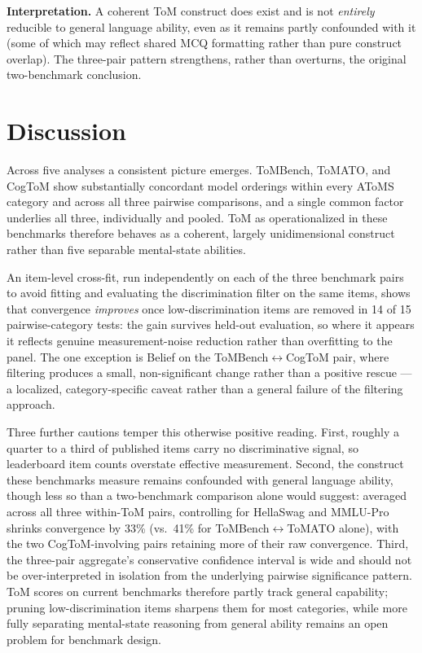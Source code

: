 \documentclass{article} %
\begin{document}
\textbf{Interpretation.} A coherent ToM construct does exist and is not \emph{entirely} reducible to general language ability, even as it remains partly confounded with it (some of which may reflect shared MCQ formatting rather than pure construct overlap). The three-pair pattern strengthens, rather than overturns, the original two-benchmark conclusion.
 
\section{Discussion}
\label{sec:discussion}
 
Across five analyses a consistent picture emerges. ToMBench, ToMATO, and CogToM show substantially concordant model orderings within every AToMS category and across all three pairwise comparisons, and a single common factor underlies all three, individually and pooled. ToM as operationalized in these benchmarks therefore behaves as a coherent, largely unidimensional construct rather than five separable mental-state abilities.

An item-level cross-fit, run independently on each of the three benchmark pairs to avoid fitting and evaluating the discrimination filter on the same items, shows that convergence \emph{improves} once low-discrimination items are removed in 14 of 15 pairwise-category tests: the gain survives held-out evaluation, so where it appears it reflects genuine measurement-noise reduction rather than overfitting to the panel. The one exception is Belief on the ToMBench$\leftrightarrow$CogToM pair, where filtering produces a small, non-significant change rather than a positive rescue --- a localized, category-specific caveat rather than a general failure of the filtering approach.

Three further cautions temper this otherwise positive reading. First, roughly a quarter to a third of published items carry no discriminative signal, so leaderboard item counts overstate effective measurement. Second, the construct these benchmarks measure remains confounded with general language ability, though less so than a two-benchmark comparison alone would suggest: averaged across all three within-ToM pairs, controlling for HellaSwag and MMLU-Pro shrinks convergence by 33\% (vs.\ 41\% for ToMBench$\leftrightarrow$ToMATO alone), with the two CogToM-involving pairs retaining more of their raw convergence. Third, the three-pair aggregate's conservative confidence interval is wide and should not be over-interpreted in isolation from the underlying pairwise significance pattern. ToM scores on current benchmarks therefore partly track general capability; pruning low-discrimination items sharpens them for most categories, while more fully separating mental-state reasoning from general ability remains an open problem for benchmark design.
\end{document}
